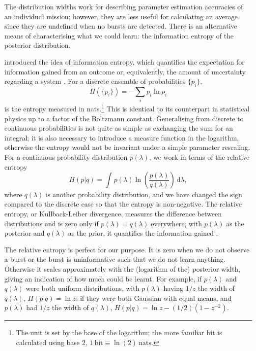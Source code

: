 \documentclass[useAMS,usedcolumn,usegraphicx,usenatbib]{mn2e}
\newcommand{\units}[1]{\ensuremath{~\mathrm{#1}}}
\newcommand{\dd}{\ensuremath{\mathrm{d}}}
\newcommand{\intd}[4]{\ensuremath{\displaystyle \int_{#1}^{#2}{#3}\,\dd{#4}}}
\begin{document}
The distribution widths work for describing parameter estimation accuracies of an individual mission; however, they are less useful for calculating an average since they are undefined when no bursts are detected. There is an alternative means of characterising what we could learn: the information entropy of the posterior distribution.

\citet{Shannon1948,Shannon1948a} introduced the idea of information entropy, which quantifies the expectation for information gained from an outcome or, equivalently, the amount of uncertainty regarding a system \citep[chapters 2 and 4]{MacKay2003}. For a discrete ensemble of probabilities $\{p_i\}$,
\begin{equation}
H(\{p_i\}) = -\sum_i p_i \ln p_i
\end{equation}
is the entropy measured in nats.\footnote{The unit is set by the base of the logarithm; the more familiar bit is calculated using base $2$, $1\units{bit} \equiv \ln(2)\units{nats}$.} This is identical to its counterpart in statistical physics up to a factor of the Boltzmann constant. Generalising from discrete to continuous probabilities is not quite as simple as exchanging the sum for an integral; it is also necessary to introduce a measure function in the logarithm, otherwise the entropy would not be invariant under a simple parameter rescaling. For a continuous probability distribution $p(\lambda)$, we work in terms of the relative entropy \citep[section 1.4]{Ihara1993}
\begin{equation}
H(p|q) = \intd{}{}{p(\lambda)\ln\left(\frac{p(\lambda)}{q(\lambda)}\right)}{\lambda},
\end{equation}
where $q(\lambda)$ is another probability distribution, and we have changed the sign compared to the discrete case so that the entropy is non-negative. The relative entropy, or Kullback-Leiber divergence, measures the difference between distributions and is zero only if $p(\lambda) = q(\lambda)$ everywhere; with $p(\lambda)$ as the posterior and $q(\lambda)$ as the prior, it quantifies the information gained \citep{Kullback1951}.

The relative entropy is perfect for our purpose. It is zero when we do not observe a burst or the burst is uninformative such that we do not learn anything. Otherwise it scales approximately with the (logarithm of the) posterior width, giving an indication of how much could be learnt. For example, if $p(\lambda)$ and $q(\lambda)$ were both uniform distributions, with $p(\lambda)$ having $1/z$ the width of $q(\lambda)$, $H(p|q) = \ln z$; if they were both Gaussian with equal means, and $p(\lambda)$ had $1/z$ the width of $q(\lambda)$, $H(p|q) = \ln z - (1/2)(1 - z^{-2})$.
\end{document}
